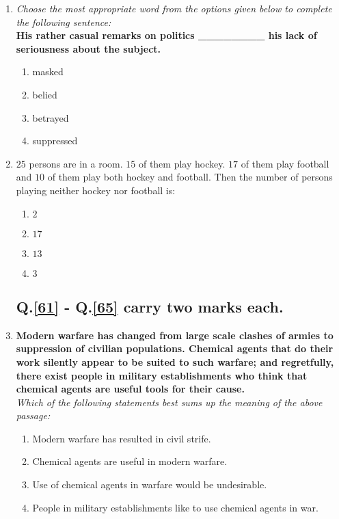 \documentclass[journal]{IEEEtran}
\begin{document}
\begin{enumerate}
            \item \textit{Choose the most appropriate word from the options given below to complete the following sentence:} \\
            \textbf{His rather casual remarks on politics \_\_\_\_\_\_\_\_ his lack of seriousness about the subject.}
            \begin{enumerate}
                \item masked
                \item belied
                \item betrayed
                \item suppressed
            \end{enumerate}

            \item \label{60}$25$ persons are in a room. $15$ of them play hockey. $17$ of them play football and $10$ of them play both hockey and football. Then the number of persons playing neither hockey nor football is:
            \begin{enumerate}
                \item $2$
                \item $17$
                \item $13$
                \item $3$
            \end{enumerate}

    \subsection*{Q.\ref{61} - Q.\ref{65} carry two marks each.}

    \item \label{61}\textbf{Modern warfare has changed from large scale clashes of armies to suppression of civilian populations. Chemical agents that do their work silently appear to be suited to such warfare; and regretfully, there exist people in military establishments who think that chemical agents are useful tools for their cause.} \\
    \textit{Which of the following statements best sums up the meaning of the above passage:}
    \begin{enumerate}
        \item Modern warfare has resulted in civil strife.
        \item Chemical agents are useful in modern warfare.
        \item Use of chemical agents in warfare would be undesirable.
        \item People in military establishments like to use chemical agents in war.
    \end{enumerate}


\end{enumerate}
\end{document}
